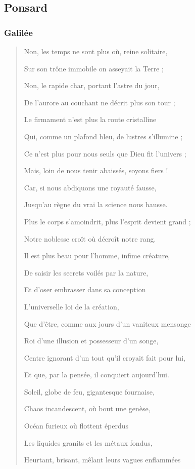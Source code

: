 \documentclass[a4paper, 11pt, oneside]{article}
\begin{document}
\subsection{Ponsard}
\subsubsection{Galilée}
\begin{quotation}
\normalsize
Non, les temps ne sont plus où, reine solitaire,

Sur son trône immobile on asseyait la Terre ;

Non, le rapide char, portant l'astre du jour,

De l'aurore au couchant ne décrit plus son tour ;

Le firmament n'est plus la route cristalline

Qui, comme un plafond bleu, de lustres s'illumine ;

Ce n'est plus pour nous seuls que Dieu fit l'univers ;

Mais, loin de nous tenir abaissés, soyons fiers !

Car, si nous abdiquons une royauté fausse,

Jusqu'au règne du vrai la science nous hausse.

Plus le corps s'amoindrit, plus l'esprit devient grand ;

Notre noblesse croît où décroît notre rang.

Il est plus beau pour l'homme, infime créature,

De saisir les secrets voilés par la nature,

Et d'oser embrasser dans sa conception

L'universelle loi de la création,

Que d'être, comme aux jours d'un vaniteux mensonge

Roi d'une illusion et possesseur d'un songe,

Centre ignorant d'un tout qu'il croyait fait pour lui,

Et que, par la pensée, il conquiert aujourd'hui.

\bigskip

Soleil, globe de feu, gigantesque fournaise,

Chaos incandescent, où bout une genèse,

Océan furieux où flottent éperdus

Les liquides granits et les métaux fondus,

Heurtant, brisant, mêlant leurs vagues enflammées


\end{quotation}
\end{document}
